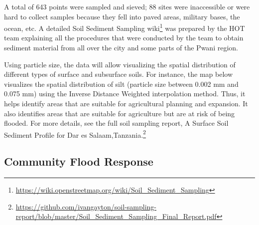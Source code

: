 \documentclass[a4paper,12pt,twoside]{article}
\begin{document}
\begin{multicols}{2}
A total of 643 points were sampled and sieved; 88 sites were inaccessible or were hard to collect samples because they fell into paved areas, military bases, the ocean, etc. A detailed Soil Sediment Sampling wiki\footnote{\url{ https://wiki.openstreetmap.org/wiki/Soil_Sediment_Sampling}} was prepared by the HOT team explaining all the procedures that were conducted by the team to obtain sediment material from all over the city and some parts of the Pwani region.

Using particle size, the data will allow visualizing the spatial distribution of different types of surface and subsurface soils. For instance, the map below visualizes the spatial distribution of silt (particle size between 0.002 mm and 0.075 mm) using the Inverse Distance Weighted interpolation method. Thus, it helps identify areas that are suitable for agricultural planning and expansion. It also identifies areas that are suitable for agriculture but are at risk of being flooded. For more details, see the full soil sampling report, A Surface Soil Sediment Profile for Dar es
Salaam,Tanzania.\footnote{\url{https://github.com/ivangayton/soil-sampling-report/blob/master/Soil_Sediment_Sampling_Final_Report.pdf}}
\end{multicols}
\newpage
\setlength{\parskip}{0.7em}
\subsection{Community Flood Response}
\end{document}
